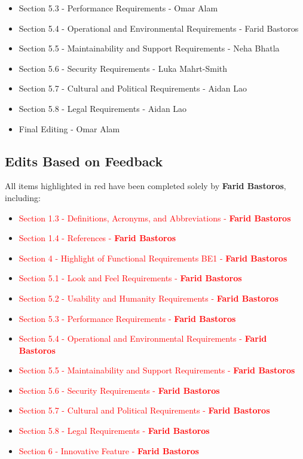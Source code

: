 \documentclass{article}
\begin{document}
\begin{itemize}
	\item Section 5.3 - Performance Requirements - Omar Alam
	\item Section 5.4 - Operational and Environmental Requirements - Farid Bastoros
	\item Section 5.5 - Maintainability and Support Requirements - Neha Bhatla
	\item Section 5.6 - Security Requirements - Luka Mahrt-Smith
	\item Section 5.7 - Cultural and Political Requirements - Aidan Lao
	\item Section 5.8 - Legal Requirements - Aidan Lao
	\item Final Editing - Omar Alam
\end{itemize}

\subsection{Edits Based on Feedback}

All items highlighted in red have been completed solely by \textbf{Farid Bastoros}, including:

\begin{itemize}
	\item \textcolor{red}{Section 1.3 - Definitions, Acronyms, and Abbreviations - \textbf{Farid Bastoros}}
	\item \textcolor{red}{Section 1.4 - References - \textbf{Farid Bastoros}}
	\item \textcolor{red}{Section 4 - Highlight of Functional Requirements BE1 - \textbf{Farid Bastoros}}
	\item \textcolor{red}{Section 5.1 - Look and Feel Requirements - \textbf{Farid Bastoros}}
	\item \textcolor{red}{Section 5.2 - Usability and Humanity Requirements - \textbf{Farid Bastoros}}
	\item \textcolor{red}{Section 5.3 - Performance Requirements - \textbf{Farid Bastoros}}
	\item \textcolor{red}{Section 5.4 - Operational and Environmental Requirements - \textbf{Farid Bastoros}}
	\item \textcolor{red}{Section 5.5 - Maintainability and Support Requirements - \textbf{Farid Bastoros}}
	\item \textcolor{red}{Section 5.6 - Security Requirements - \textbf{Farid Bastoros}}
	\item \textcolor{red}{Section 5.7 - Cultural and Political Requirements - \textbf{Farid Bastoros}}
	\item \textcolor{red}{Section 5.8 - Legal Requirements - \textbf{Farid Bastoros}}
	\item \textcolor{red}{Section 6 - Innovative Feature - \textbf{Farid Bastoros}}
\end{itemize}
\end{document}
